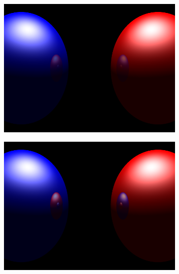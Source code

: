 \documentclass{article}
\begin{document}
\begin{figure}[hb]
  \begin{subfigure}{0.45\textwidth}
    \includegraphics[width=1\textwidth]{images/refl025.png}
  \end{subfigure}
  \begin{subfigure}{0.45\textwidth}
    \includegraphics[width=1\textwidth]{images/refl05.png}
  \end{subfigure}


\end{figure}
\end{document}
